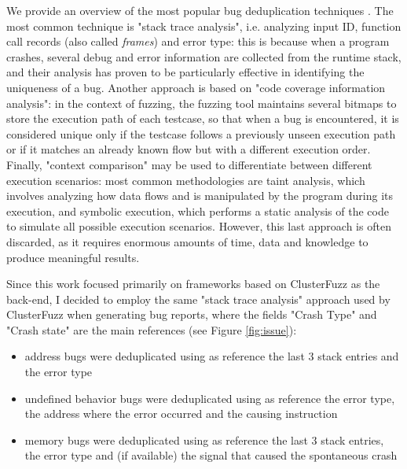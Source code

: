 We provide an overview of the most popular bug deduplication techniques \cite{dedup_survey}.
The most common technique is "stack trace analysis", i.e. analyzing input ID, function call records (also called \textit{frames}) and error type: this is because when a program crashes, several debug and error information are collected from the runtime stack, and their analysis has proven to be particularly effective in identifying the uniqueness of a bug.
Another approach is based on "code coverage information analysis": in the context of fuzzing, the fuzzing tool maintains several bitmaps to store the execution path of each testcase, so that when a bug is encountered, it is considered unique only if the testcase follows a previously unseen execution path or if it matches an already known flow but with a different execution order.
Finally, "context comparison" may be used to differentiate between different execution scenarios: most common methodologies are taint analysis, which involves analyzing how data flows and is manipulated by the program during its execution, and symbolic execution, which performs a static analysis of the code to simulate all possible execution scenarios. However, this last approach is often discarded, as it requires enormous amounts of time, data and knowledge to produce meaningful results.
\newline

Since this work focused primarily on frameworks based on ClusterFuzz as the back-end, I decided to employ the same "stack trace analysis" approach used by ClusterFuzz when generating bug reports, where the fields "Crash Type" and "Crash state" are the main references (see Figure \ref{fig:issue}):
\begin{itemize}
    \item address bugs were deduplicated using as reference the last 3 stack entries and the error type
    \item undefined behavior bugs were deduplicated using as reference the error type, the address where the error occurred and the causing instruction
    \item memory bugs were deduplicated using as reference the last 3 stack entries, the error type and (if available) the signal that caused the spontaneous crash
\end{itemize}